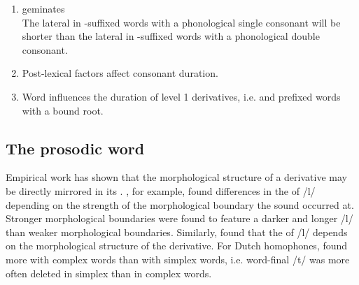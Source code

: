 \begin{description}
\begin{enumerate}[leftmargin=*]
		
	\item  {} geminates \\
	The lateral in -suffixed words with a phonological single consonant will be shorter than the lateral in  -suffixed words with a phonological double consonant. 
	
	\item Post-lexical factors affect consonant duration.
	


	\item Word  influences the duration of {level 1} derivatives, i.e.  and prefixed words with a bound root.
	
\end{enumerate}
\end{description}


\subsection{The prosodic word} {\label{prosodic word}}


Empirical work has shown that the morphological structure of a derivative may be directly mirrored in its . %
\cite{Sproat.1993b}, for example, found differences in the  of /l/ depending on the strength of the morphological boundary the sound occurred at. Stronger morphological boundaries were found to feature a darker and longer /l/ than weaker morphological boundaries. Similarly, \cite{LeeKim.2013} found that the  of /l/ depends on the morphological structure of the derivative. 
For Dutch homophones, \cite{Schuppler.2012} found more  with complex words than with simplex words, i.e. word-final /t/ was more often deleted in simplex than in complex words.


